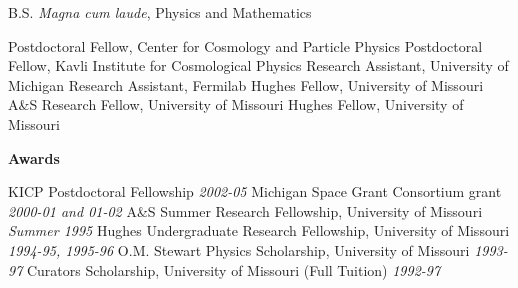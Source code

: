 \tsp
\noindent
\makebox[1.25in][l]{}
\parbox{5.40in}{B.S. {\it Magna cum laude}, Physics and Mathematics}

%
%

\ssp
\ssp
\noindent
{}
	{Postdoctoral Fellow, Center for Cosmology and Particle Physics}
        \newline
{}
        \hfill
\newline
\makebox[1.25in][l]{}
	{Postdoctoral Fellow, Kavli Institute for Cosmological Physics}
	\newline
{}
	\hfill
\newline
\makebox[1.25in][l]{}
	{{Research Assistant, University of Michigan}}
	\hfill
\newline
\makebox[1.25in][l]{}
	{Research Assistant, Fermilab}
	\hfill
{}
\newline
\makebox[1.25in][l]{}
	{Hughes Fellow, University of Missouri}
	\hfill
\newline
\makebox[1.25in][l]{}
	{A\&S Research Fellow, University of Missouri}
	\hfill
\newline
\makebox[1.25in][l]{}
	{Hughes Fellow, University of Missouri}
	\hfill

\ssp
\ssp
\noindent
\parbox[l]{1.25in}{{\bf Awards}}
\parbox[t]{5.40in}{
KICP Postdoctoral Fellowship \hfill {\small \it 2002-05} \newline
Michigan Space Grant Consortium grant  \hfill 
       {\small \it 2000-01 and 01-02 }\newline
A\&S Summer Research Fellowship, University of Missouri \hfill 
       {\small \it Summer 1995}\newline
Hughes Undergraduate Research Fellowship, University of
       Missouri  \hfill {\small \it 1994-95, 1995-96}\newline
O.M. Stewart Physics Scholarship, University
       of Missouri \hfill {\small \it 1993-97}\newline
Curators Scholarship, University of Missouri 
       (Full Tuition) \hfill {\small \it 1992-97}
}


